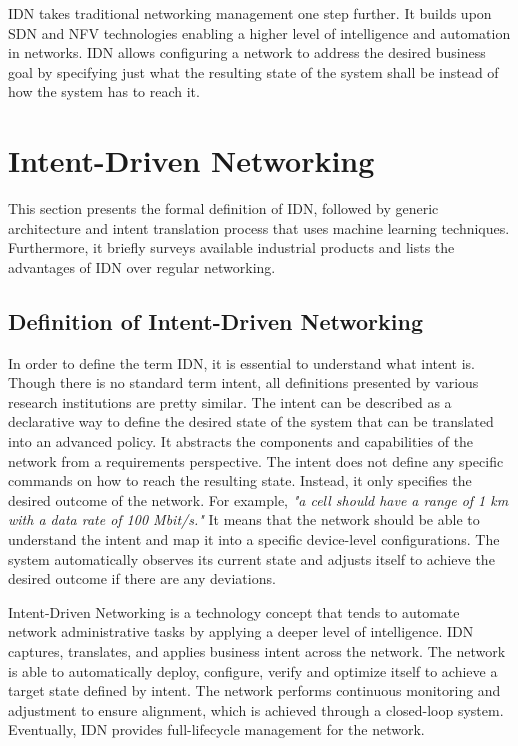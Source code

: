 IDN takes traditional networking management one step further. It builds upon SDN and NFV technologies enabling a higher level of intelligence and automation in networks. IDN allows configuring a network to address the desired business goal by specifying just what the resulting state of the system shall be instead of how the system has to reach it.


\section{Intent-Driven Networking}
\label{sec:Intent_Driven_Networking}
This section presents the formal definition of IDN, followed by generic architecture and intent translation process that uses machine learning techniques. Furthermore, it briefly surveys available industrial products and lists the advantages of IDN over regular networking.

\subsection{Definition of Intent-Driven Networking}
In order to define the term IDN, it is essential to understand what intent is. Though there is no standard term intent, all definitions presented by various research institutions are pretty similar. The intent can be described as a declarative way to define the desired state of the system that can be translated into an advanced policy. It abstracts the components and capabilities of the network from a requirements perspective. The intent does not define any specific commands on how to reach the resulting state. Instead, it only specifies the desired outcome of the network. For example, \textit{"a cell should have a range of 1 km with a data rate of 100 Mbit/s."} It means that the network should be able to understand the intent and map it into a specific device-level configurations.  The system automatically observes its current state and adjusts itself to achieve the desired outcome if there are any deviations. \cite[22867]{8968429}

Intent-Driven Networking is a technology concept that tends to automate network administrative tasks by applying a deeper level of intelligence. IDN captures, translates, and applies business intent across the network. The network is able to automatically deploy, configure, verify and optimize itself to achieve a target state defined by intent. The network performs continuous monitoring and adjustment to ensure alignment, which is achieved through a closed-loop system. Eventually, IDN provides full-lifecycle management for the network. \cite{8968429}


